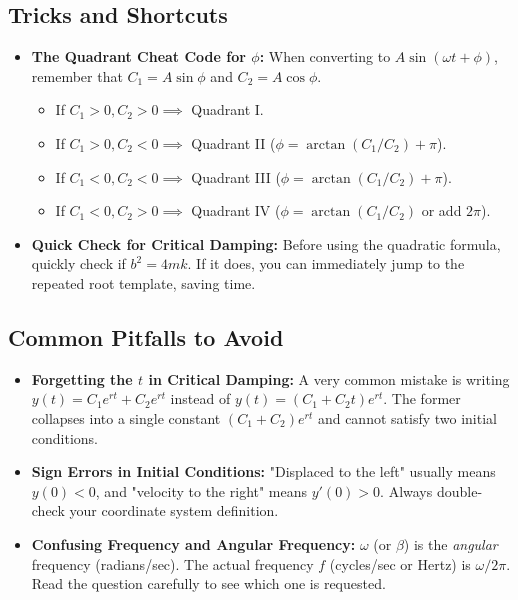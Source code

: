 \documentclass[11pt]{article}
\begin{document}
\subsection{Tricks and Shortcuts}
\begin{itemize}
    \item \textbf{The Quadrant Cheat Code for $\phi$:} When converting to $A \sin(\omega t + \phi)$, remember that $C_1 = A \sin \phi$ and $C_2 = A \cos \phi$. 
    \begin{itemize}
        \item If $C_1 > 0, C_2 > 0 \implies$ Quadrant I.
        \item If $C_1 > 0, C_2 < 0 \implies$ Quadrant II ($\phi = \arctan(C_1/C_2) + \pi$).
        \item If $C_1 < 0, C_2 < 0 \implies$ Quadrant III ($\phi = \arctan(C_1/C_2) + \pi$).
        \item If $C_1 < 0, C_2 > 0 \implies$ Quadrant IV ($\phi = \arctan(C_1/C_2)$ or add $2\pi$).
    \end{itemize}
    \item \textbf{Quick Check for Critical Damping:} Before using the quadratic formula, quickly check if $b^2 = 4mk$. If it does, you can immediately jump to the repeated root template, saving time.
\end{itemize}

\subsection{Common Pitfalls to Avoid}
\begin{itemize}
    \item \textbf{Forgetting the $t$ in Critical Damping:} A very common mistake is writing $y(t) = C_1 e^{rt} + C_2 e^{rt}$ instead of $y(t) = (C_1 + C_2 t)e^{rt}$. The former collapses into a single constant $(C_1+C_2)e^{rt}$ and cannot satisfy two initial conditions.
    \item \textbf{Sign Errors in Initial Conditions:} "Displaced to the left" usually means $y(0) < 0$, and "velocity to the right" means $y'(0) > 0$. Always double-check your coordinate system definition.
    \item \textbf{Confusing Frequency and Angular Frequency:} $\omega$ (or $\beta$) is the \textit{angular} frequency (radians/sec). The actual frequency $f$ (cycles/sec or Hertz) is $\omega / 2\pi$. Read the question carefully to see which one is requested.
\end{itemize}
\end{document}
